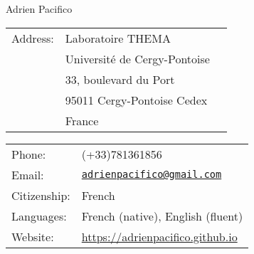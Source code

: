 \documentclass[a4paper,11pt]{article} %
\begin{document}




\vspace{1.5cm}

\begin{center}

{\LARGE Adrien Pacifico} \\





\medskip



\end{center}


\vspace{0.25in}

\begin{minipage}{0.50\linewidth}
\begin{tabular}{lll}
 Address: & Laboratoire THEMA\\
 & Université de Cergy-Pontoise\\
 & 33, boulevard du Port\\
&95011 Cergy-Pontoise Cedex\\
&France\\


\end{tabular}


\end{minipage}
\begin{minipage}{0.50\linewidth}
  \begin{tabular}{ll}
    Phone: & (+33)781361856 \\
    Email: & \href{mailto:adrienpacifico@gmail.com}{\tt adrienpacifico@gmail.com} \\
     Citizenship: & French \\
     Languages:&French (native), English (fluent)\\ 
     Website: &\url{https://adrienpacifico.github.io}

  \end{tabular}
\end{minipage}
\vspace{0.3cm}
\end{document}
